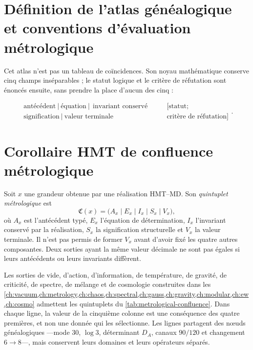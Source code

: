 \section{Définition de l'atlas généalogique et conventions d'évaluation métrologique}

Cet atlas n'est pas un tableau de coïncidences. Son noyau mathématique conserve
cinq champs inséparables ; le statut logique et le critère de réfutation sont énoncés ensuite, sans prendre la place d'aucun des cinq :

\begin{equation}
\boxed{
\begin{gathered}
\text{antécédent}\ \big|\ \text{équation}\ \big|\
\ \text{invariant conservé}\\
\text{signification}\ \big|\ \text{valeur terminale}
\end{gathered}}
\qquad
\begin{gathered}
[\text{statut};\\ \text{critère de réfutation}]
\end{gathered}.
\label{eq:atlas-six-fields}
\end{equation}


\section{Corollaire HMT de confluence métrologique}
\label{sec:metrological-confluence}

\begin{definition}
Soit \(x\) une grandeur obtenue par une réalisation HMT--MD. Son
\emph{quintuplet
métrologique} est
\[
 \mathfrak C(x)=
 \bigl(A_x\mid E_x\mid I_x\mid S_x\mid V_x\bigr),
\]
où \(A_x\) est l'antécédent typé, \(E_x\) l'équation de
détermination, \(I_x\) l'invariant conservé par la réalisation,
\(S_x\) la signification
structurelle et \(V_x\) la valeur terminale. Il n'est pas permis de former \(V_x\) avant
d'avoir fixé les quatre autres composantes. Deux sorties ayant la même valeur décimale
ne sont pas égales si leurs antécédents ou leurs invariants diffèrent.
\end{definition}

\begin{corollary}
\label{cor:metrological-confluence}
Les sorties de vide, d'action, d'information, de température, de gravité,
de criticité, de spectre, de mélange et de cosmologie construites dans les
\cref{ch:vacuum,ch:metrology,ch:chaos,ch:spectral,ch:gauss,ch:gravity,ch:modular,ch:ew,ch:cosmo}
admettent les quintuplets du \cref{tab:metrological-confluence}. Dans chaque
ligne, la valeur de la cinquième colonne est une conséquence des quatre premières, et
non une donnée qui les sélectionne. Les lignes partagent des nœuds généalogiques
---mode \(30\), \(\log3\), déterminant \(D_A\), canaux \(90/120\) et changement
\(6\to8\)---, mais conservent leurs domaines et leurs opérateurs séparés.
\end{corollary}

